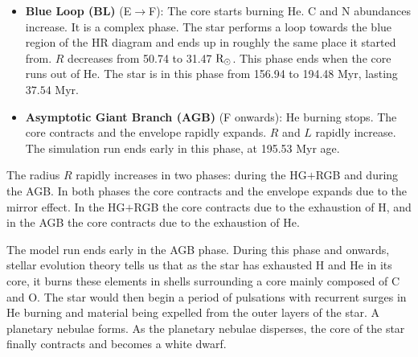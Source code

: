 \begin{itemize}
    \item  \textbf{Blue Loop (BL)} (E$\rightarrow$F): The core starts burning He. C and N abundances increase. It is a complex phase. The star performs a loop towards the blue region of the HR diagram and ends up in roughly the same place it started from. $R$ decreases from 50.74 to 31.47 ${\rm R}_\odot$. This phase ends when the core runs out of He. The star is in this phase from 156.94 to 194.48 Myr, lasting $37.54$ Myr.
    \item  \textbf{Asymptotic Giant Branch (AGB)} (F onwards): He burning stops. The core contracts and the envelope rapidly expands. $R$ and $L$ rapidly increase. The simulation run ends early in this phase, at 195.53 Myr age.
\end{itemize}

The radius $R$ rapidly increases in two phases: during the HG$+$RGB and during the AGB. In both phases the core contracts and the envelope expands due to the mirror effect. In the HG$+$RGB the core contracts due to the exhaustion of H, and in the AGB the core contracts due to the exhaustion of He.

The model run ends early in the AGB phase. During this phase and onwards, stellar evolution theory tells us that as the star has exhausted H and He in its core, it burns these elements in shells surrounding a core mainly composed of C and O. The star would then begin a period of pulsations with recurrent surges in He burning and material being expelled from the outer layers of the star. A planetary nebulae forms. As the planetary nebulae disperses, the core of the star finally contracts and becomes a white dwarf.

